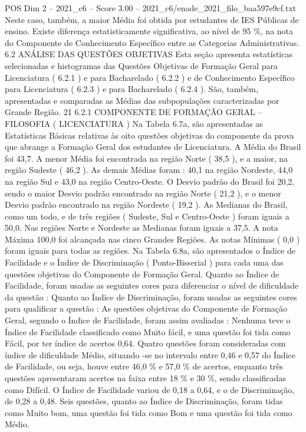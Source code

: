 \begin{textsample}{POS Dim 2 – 2021\_c6 – Score 3.00 – 2021\_c6/enade\_2021\_filo\_baa597e9cf.txt}
Neste caso, também, a maior Média foi obtida por estudantes de IES Públicas de ensino.
Existe diferença estatisticamente significativa, ao nível de 95 \%, na nota do Componente de Conhecimento Específico entre as Categorias Administrativas. 6.2 ANÁLISE DAS QUESTÕES OBJETIVAS Esta seção apresenta estatísticas selecionadas e histogramas das Questões Objetivas de Formação Geral para Licenciatura ( 6.2.1 ) e para Bacharelado ( 6.2.2 ) e de Conhecimento Específico para Licenciatura ( 6.2.3 ) e para Bacharelado ( 6.2.4 ).
São, também, apresentadas e comparadas as Médias das subpopulações caracterizadas por Grande Região. 21 6.2.1 COMPONENTE DE FORMAÇÃO GERAL – FILOSOFIA ( LICENCIATURA ) Na Tabela 6.7a, são apresentadas as Estatísticas Básicas relativas às oito questões objetivas do componente da prova que abrange a Formação Geral dos estudantes de Licenciatura.
A Média do Brasil foi 43,7.
A menor Média foi encontrada na região Norte ( 38,5 ), e a maior, na região Sudeste ( 46,2 ).
As demais Médias foram : 40,1 na região Nordeste, 44,0 na região Sul e 43,0 na região Centro-Oeste.
O Desvio padrão do Brasil foi 20,2, sendo o maior Desvio padrão encontrado na região Norte ( 21,2 ), e o menor Desvio padrão encontrado na região Nordeste ( 19,2 ).
As Medianas do Brasil, como um todo, e de três regiões ( Sudeste, Sul e Centro-Oeste ) foram iguais a 50,0.
Nas regiões Norte e Nordeste as Medianas foram iguais a 37,5.
A nota Máxima 100,0 foi alcançada nas cinco Grandes Regiões.
As notas Mínimas ( 0,0 ) foram iguais para todas as regiões.
Na Tabela 6.8a, são apresentados o Índice de Facilidade e o Índice de Discriminação ( Ponto-Bisserial ) para cada uma das questões objetivas do Componente de Formação Geral.
Quanto ao Índice de Facilidade, foram usadas as seguintes cores para diferenciar o nível de dificuldade da questão : Quanto ao Índice de Discriminação, foram usadas as seguintes cores para qualificar a questão : As questões objetivas do Componente de Formação Geral, segundo o Índice de Facilidade, foram assim avaliadas : Nenhuma teve o Índice de Facilidade classificado como Muito fácil, e uma questão foi tida como Fácil, por ter índice de acertos 0,64.
Quatro questões foram consideradas com índice de dificuldade Médio, situando -se no intervalo entre 0,46 e 0,57 do Índice de Facilidade, ou seja, houve entre 46,0 \% e 57,0 \% de acertos, enquanto três questões apresentaram acertos na faixa entre 18 \% e 30 \%, sendo classificadas como Difícil.
O Índice de Facilidade variou de 0,18 a 0,64, e o de Discriminação, de 0,28 a 0,48.
Seis questões, quanto ao Índice de Discriminação, foram tidas como Muito bom, uma questão foi tida como Bom e uma questão foi tida como Médio.

\end{textsample}
